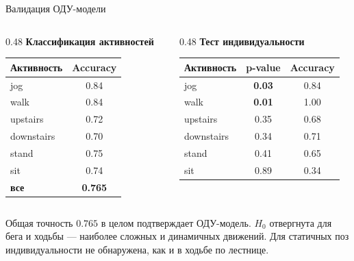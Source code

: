 \documentclass[10pt]{beamer}
\begin{document}
	\begin{frame}{Валидация ОДУ-модели}

		\begin{columns}[T]
			\begin{column}{0.48\textwidth}
				\centering
				\textbf{Классификация активностей}

				\vspace{0.5em}
				\footnotesize
				\begin{tabular}{lc}
					\toprule
					Активность & Accuracy \\
					\midrule
					jog & 0.84 \\
					walk & 0.84 \\
					upstairs & 0.72 \\
					downstairs & 0.70 \\
					stand & 0.75 \\
					sit & 0.74 \\
					\textbf{все} & \textbf{0.765} \\
					\bottomrule
				\end{tabular}
			\end{column}
			\begin{column}{0.48\textwidth}
				\centering
				\textbf{Тест индивидуальности}

				\vspace{0.5em}
				\footnotesize
				\begin{tabular}{lcc}
					\toprule
					Активность & p-value & Accuracy \\
					\midrule
					jog & \textbf{0.03} & 0.84 \\
					walk & \textbf{0.01} & 1.00 \\
					upstairs & 0.35 & 0.68 \\
					downstairs & 0.34 & 0.71 \\
					stand & 0.41 & 0.65 \\
					sit & 0.89 & 0.34 \\
					\bottomrule
				\end{tabular}
			\end{column}
		\end{columns}

		\vspace{1em}
		Общая точность $0.765$ в целом подтверждает ОДУ-модель. $H_0$ отвергнута для бега и ходьбы --- наиболее сложных и динамичных движений. Для статичных поз индивидуальности не обнаружена, как и в ходьбе по лестнице.

	\end{frame}
\end{document}
